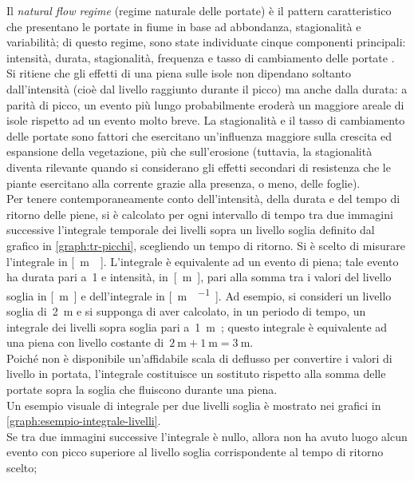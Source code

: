 Il \emph{natural flow regime} (regime naturale delle portate) è il pattern caratteristico che presentano le portate in fiume in base ad abbondanza, stagionalità e variabilità; di questo regime, sono state individuate cinque componenti principali: intensità, durata, stagionalità, frequenza e tasso di cambiamento delle portate .
\\
Si ritiene che gli effetti di una piena sulle isole non dipendano soltanto dall'intensità (cioè dal livello raggiunto durante il picco) ma anche dalla durata: a parità di picco, un evento più lungo probabilmente eroderà un maggiore areale di isole rispetto ad un evento molto breve.
La stagionalità e il tasso di cambiamento delle portate sono fattori che esercitano un'influenza maggiore sulla crescita ed espansione della vegetazione, più che sull'erosione (tuttavia, la stagionalità diventa rilevante quando si considerano gli effetti secondari di resistenza che le piante esercitano alla corrente grazie alla presenza, o meno, delle foglie). 
\\
Per tenere contemporaneamente conto dell'intensità, della durata e del tempo di ritorno delle piene, si è calcolato per ogni intervallo di tempo tra due immagini successive l'integrale temporale dei livelli sopra un livello soglia definito dal grafico in \cref{graph:tr-picchi}, scegliendo un tempo di ritorno.
Si è scelto di misurare l'integrale in \si{[\m\giorno]}.
L'integrale è equivalente ad un evento di piena; tale evento ha durata pari a~\SI{1}{\giorno} e intensità, in~\si{[\m]}, pari alla somma tra i valori del livello soglia in \si{[\m]} e dell'integrale in \si{[\m\giorno\per\giorno]}.
Ad esempio, si consideri un livello soglia di~\SI{2}{\m} e si supponga di aver calcolato, in un periodo di tempo, un integrale dei livelli sopra soglia pari a~\SI{1}{\m\giorno}; questo integrale è equivalente ad una piena con livello costante di~$\SI{2}{\m} + \SI{1}{\m} = \SI{3}{\m}$.
\\
Poiché non è disponibile un'affidabile scala di deflusso per convertire i valori di livello in portata, l'integrale costituisce un sostituto rispetto alla somma delle portate sopra la soglia che fluiscono durante una piena.
\\
Un esempio visuale di integrale per due livelli soglia è mostrato nei grafici in \cref{graph:esempio-integrale-livelli}.
\\
Se tra due immagini successive l'integrale è nullo, allora non ha avuto luogo alcun evento con picco superiore al livello soglia corrispondente al tempo di ritorno scelto;
